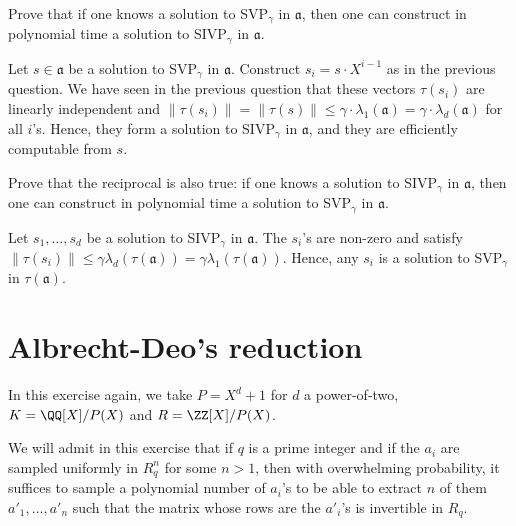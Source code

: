 \documentclass[11pt]{exam}
\theoremstyle{definition}
\begin{document}
\begin{questions}
\question Prove that if one knows a solution to SVP$_\gamma$ in $\mathfrak{a}$, then one can construct in polynomial time a solution to SIVP$_\gamma$ in $\mathfrak{a}$.

\begin{solution}
Let $s \in \mathfrak{a}$ be a solution to SVP$_\gamma$ in $\mathfrak{a}$. Construct $s_i = s \cdot X^{i-1}$ as in the previous question. We have seen in the previous question that these vectors $\tau(s_i)$ are linearly independent and $\|\tau(s_i)\| = \|\tau(s)\| \leq \gamma \cdot \lambda_1(\mathfrak{a}) = \gamma \cdot \lambda_d(\mathfrak{a})$ for all $i$'s. Hence, they form a solution to SIVP$_\gamma$ in $\mathfrak{a}$, and they are efficiently computable from $s$.
\end{solution}


\question Prove that the reciprocal is also true: if one knows a solution to SIVP$_\gamma$ in $\mathfrak{a}$, then one can construct in polynomial time a solution to SVP$_\gamma$ in $\mathfrak{a}$.

\begin{solution}
Let $s_1, \dots, s_d$ be a solution to SIVP$_\gamma$ in $\mathfrak{a}$. The $s_i$'s are non-zero and satisfy $\|\tau(s_i)\| \leq \gamma \lambda_d(\tau(\mathfrak{a})) = \gamma \lambda_1(\tau(\mathfrak{a}))$. Hence, any $s_i$ is a solution to SVP$_\gamma$ in $\tau(\mathfrak{a})$.
\end{solution}

\end{questions}

\section{Albrecht-Deo's reduction}
In this exercise again, we take $P = X^d+1$ for $d$ a power-of-two, $K = \QQ[X]/P(X)$ and $R = \ZZ[X]/P(X)$.

We will admit in this exercise that if $q$ is a prime integer and if the $a_i$ are sampled uniformly in $R_q^n$ for some $n > 1$, then with overwhelming probability, it suffices to sample a polynomial number of $a_i$'s to be able to extract $n$ of them $a'_1, \dots, a'_n$ such that the matrix whose rows are the $a'_i$'s is invertible in $R_q$.
\end{document}
